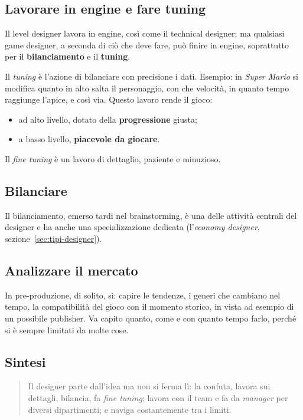 \subsection{Lavorare in engine e fare tuning}

Il level designer lavora in engine, così come il technical designer; ma
qualsiasi game designer, a seconda di ciò che deve fare, può finire in
engine, soprattutto per il \textbf{bilanciamento} e il \textbf{tuning}.

Il \emph{tuning} è l'azione di bilanciare con precisione i dati. Esempio: in
\emph{Super Mario} si modifica quanto in alto salta il personaggio, con che
velocità, in quanto tempo raggiunge l'apice, e così via. Questo lavoro rende
il gioco:
\begin{itemize}
  \item ad alto livello, dotato della \textbf{progressione} giusta;
  \item a basso livello, \textbf{piacevole da giocare}.
\end{itemize}
Il \emph{fine tuning} è un lavoro di dettaglio, paziente e minuzioso.

\subsection{Bilanciare}

Il bilanciamento, emerso tardi nel brainstorming, è una delle attività
centrali del designer e ha anche una specializzazione dedicata
(l'\emph{economy designer}, sezione~\ref{sec:tipi-designer}).

\subsection{Analizzare il mercato}

In pre-produzione, di solito, sì: capire le tendenze, i generi che cambiano
nel tempo, la compatibilità del gioco con il momento storico, in vista ad
esempio di un possibile publisher. Va capito quanto, come e con quanto tempo
farlo, perché si è sempre limitati da molte cose.

\subsection{Sintesi}

\begin{quote}
Il designer parte dall'idea ma non si ferma lì: la confuta, lavora sui
dettagli, bilancia, fa \emph{fine tuning}; lavora con il team e fa da
\emph{manager} per diversi dipartimenti; e naviga costantemente tra i limiti.
\end{quote}

